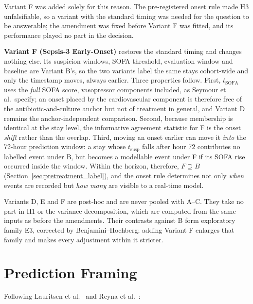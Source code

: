 Variant F was added solely for this reason. The pre-registered onset rule made
H3 unfalsifiable, so a variant with the standard timing was needed for the
question to be answerable; the amendment was fixed before Variant F was fitted,
and its performance played no part in the decision.

\textbf{Variant F (Sepsis-3 Early-Onset)} restores the standard timing and
changes nothing else. Its suspicion windows, SOFA threshold, evaluation window
and baseline are Variant B's, so the two variants label the same stays
cohort-wide and only the timestamp moves, always earlier. Three properties
follow. First, $t_{\text{SOFA}}$ uses the \emph{full} SOFA score, vasopressor
components included, as Seymour et al.\ specify; an onset placed by the
cardiovascular component is therefore free of the antibiotic-and-culture anchor
but not of treatment in general, and Variant D remains the anchor-independent
comparison. Second, because membership is identical at the stay level, the
informative agreement statistic for F is the onset \emph{shift} rather than the
overlap. Third, moving an onset earlier can move it \emph{into} the 72-hour
prediction window: a stay whose $t_{\text{susp}}$ falls after hour 72
contributes no labelled event under B, but becomes a modellable event under F
if its SOFA rise occurred inside the window. Within the horizon, therefore,
$F \supseteq B$ (Section~\ref{sec:pretreatment_label}), and the onset rule
determines not only \emph{when} events are recorded but \emph{how many} are
visible to a real-time model.

Variants D, E and F are post-hoc and are never pooled with A--C. They take no
part in H1 or the variance decomposition, which are computed from the same
inputs as before the amendments. Their contrasts against B form exploratory
family E3, corrected by Benjamini--Hochberg; adding Variant F enlarges that
family and makes every adjustment within it stricter.


\section{Prediction Framing}
\label{sec:framing}

Following Lauritsen et al.\ \cite{lauritsen2021framing} and Reyna et al.\
\cite{reyna2020utility}:

